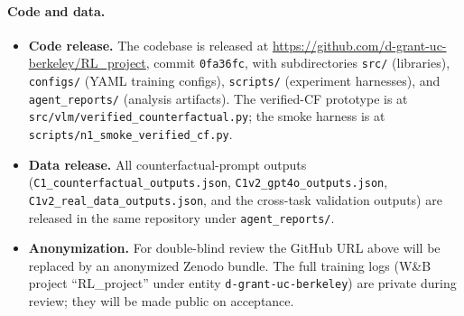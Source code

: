 \paragraph{Code and data.}
\begin{itemize}\itemsep0pt
\item \textbf{Code release.} The codebase is released at
\url{https://github.com/d-grant-uc-berkeley/RL_project}, commit
\texttt{0fa36fc}, with subdirectories \texttt{src/} (libraries),
\texttt{configs/} (YAML training configs), \texttt{scripts/}
(experiment harnesses), and \texttt{agent\_reports/} (analysis
artifacts). The verified-CF prototype is at
\texttt{src/vlm/verified\_counterfactual.py}; the smoke harness is at
\texttt{scripts/n1\_smoke\_verified\_cf.py}.
\item \textbf{Data release.} All counterfactual-prompt outputs
(\texttt{C1\_counterfactual\_outputs.json},
\texttt{C1v2\_gpt4o\_outputs.json},
\texttt{C1v2\_real\_data\_outputs.json}, and the cross-task validation
outputs) are released in the same repository under
\texttt{agent\_reports/}.
\item \textbf{Anonymization.} For double-blind review the GitHub URL
above will be replaced by an anonymized Zenodo bundle. The full
training logs (W\&B project ``RL\_project'' under entity
\texttt{d-grant-uc-berkeley}) are private during review; they will be
made public on acceptance.
\end{itemize}

